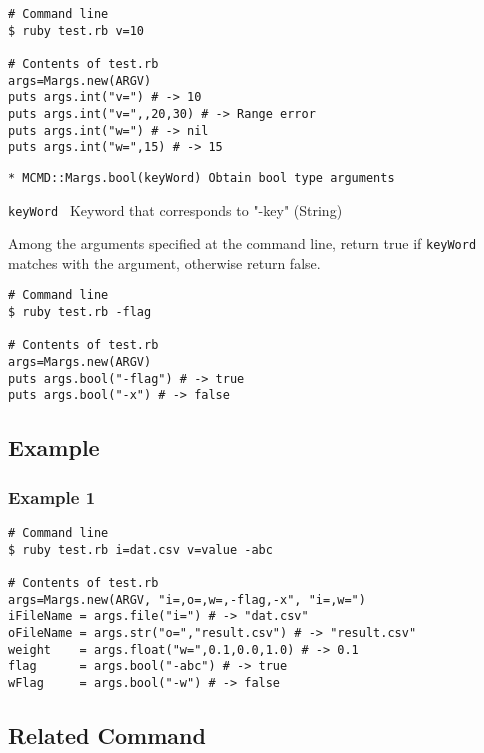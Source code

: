 \begin{Verbatim}[baselinestretch=0.7,frame=single]
# Command line
$ ruby test.rb v=10

# Contents of test.rb
args=Margs.new(ARGV)
puts args.int("v=") # -> 10
puts args.int("v=",,20,30) # -> Range error 
puts args.int("w=") # -> nil
puts args.int("w=",15) # -> 15
\end{Verbatim}

{\Large
\begin{verbatim}
* MCMD::Margs.bool(keyWord) Obtain bool type arguments 
\end{verbatim}
}

\begin{description}
\item {\large \verb/keyWord /} Keyword that corresponds to "-key" (String)
\end{description}

Among the arguments specified at the command line, return true if \verb/keyWord/ matches with the argument, otherwise return false. 


\begin{Verbatim}[baselinestretch=0.7,frame=single]
# Command line 
$ ruby test.rb -flag

# Contents of test.rb
args=Margs.new(ARGV)
puts args.bool("-flag") # -> true
puts args.bool("-x") # -> false
\end{Verbatim}



\subsection{Example}
\subsubsection*{Example 1}


\begin{Verbatim}[baselinestretch=0.7,frame=single]
# Command line 
$ ruby test.rb i=dat.csv v=value -abc

# Contents of test.rb
args=Margs.new(ARGV, "i=,o=,w=,-flag,-x", "i=,w=")
iFileName = args.file("i=") # -> "dat.csv"
oFileName = args.str("o=","result.csv") # -> "result.csv"
weight    = args.float("w=",0.1,0.0,1.0) # -> 0.1
flag      = args.bool("-abc") # -> true
wFlag     = args.bool("-w") # -> false
\end{Verbatim}

\subsection{Related Command}


%

